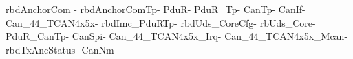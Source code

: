 rbdAnchorCom -
rbdAnchorComTp-
PduR-
PduR_Tp-
CanTp-
CanIf-
Can_44_TCAN4x5x-
rbdImc_PduRTp-
rbdUds_CoreCfg-
rbUds_Core-
PduR_CanTp-
CanSpi-
Can_44_TCAN4x5x_Irq-
Can_44_TCAN4x5x_Mcan-
rbdTxAncStatus-
CanNm
